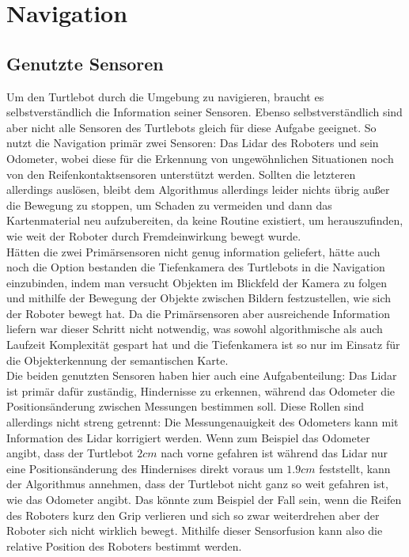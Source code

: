\section{Navigation}\label{sec:navigation}
\subsection{Genutzte Sensoren}\label{subsec:genutzte-sensoren}
Um den Turtlebot durch die Umgebung zu navigieren, braucht es selbstverständlich die Information seiner Sensoren.
Ebenso selbstverständlich sind aber nicht alle Sensoren des Turtlebots gleich für diese Aufgabe geeignet.
So nutzt die Navigation primär zwei Sensoren: Das Lidar des Roboters und sein Odometer, wobei diese für die Erkennung
von ungewöhnlichen Situationen noch von den Reifenkontaktsensoren unterstützt werden.
Sollten die letzteren allerdings auslösen, bleibt dem Algorithmus allerdings leider nichts übrig außer die Bewegung zu
stoppen, um Schaden zu vermeiden und dann das Kartenmaterial neu aufzubereiten, da keine Routine existiert, um herauszufinden,
wie weit der Roboter durch Fremdeinwirkung bewegt wurde.\\


Hätten die zwei Primärsensoren nicht genug information geliefert, hätte auch noch die Option bestanden die Tiefenkamera
des Turtlebots in die Navigation einzubinden, indem man versucht Objekten im Blickfeld der Kamera zu folgen und mithilfe
der Bewegung der Objekte zwischen Bildern festzustellen, wie sich der Roboter bewegt hat.
Da die Primärsensoren aber ausreichende Information liefern war dieser Schritt nicht notwendig, was sowohl algorithmische
als auch Laufzeit Komplexität gespart hat und die Tiefenkamera ist so nur im Einsatz für die Objekterkennung der semantischen
Karte.\\

Die beiden genutzten Sensoren haben hier auch eine Aufgabenteilung: Das Lidar ist primär dafür zuständig, Hindernisse zu
erkennen, während das Odometer die Positionsänderung zwischen Messungen bestimmen soll.
Diese Rollen sind allerdings nicht streng getrennt: Die Messungenauigkeit des Odometers kann mit Information des Lidar
korrigiert werden.
Wenn zum Beispiel das Odometer angibt, dass der Turtlebot $2cm$ nach vorne gefahren ist während das Lidar nur eine
Positionsänderung des Hindernises direkt voraus um $1.9cm$ feststellt, kann der Algorithmus annehmen, dass der Turtlebot
nicht ganz so weit gefahren ist, wie das Odometer angibt.
Das könnte zum Beispiel der Fall sein, wenn die Reifen des Roboters kurz den Grip verlieren und sich so zwar weiterdrehen
aber der Roboter sich nicht wirklich bewegt.
Mithilfe dieser Sensorfusion kann also die relative Position des Roboters bestimmt werden.\\

